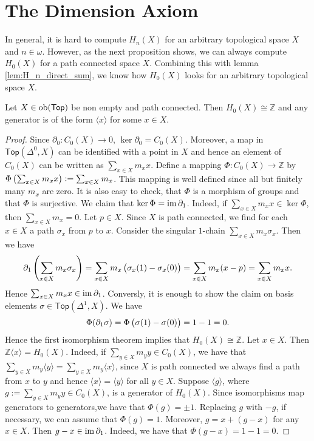 \section*{The Dimension Axiom}
In general, it is hard to compute $H_n(X)$ for an arbitrary topological space $X$ and $n \in \omega$. However, as the next proposition shows, we can always compute $H_0(X)$ for a path connected space $X$. Combining this with lemma \ref{lem:H_n_direct_sum}, we know how $H_0(X)$ looks for an arbitrary topological space $X$.

\begin{proposition}
	Let $X \in \operatorname{ob}(\mathsf{Top})$ be non empty and path connected. Then $H_0(X) \cong \mathbb{Z}$ and any generator is of the form $\langle x \rangle$ for some $x \in X$.
\end{proposition}

\begin{proof}
	Since $\partial_0 : C_0(X) \to 0$, $\ker \partial_0 = C_0(X)$. Moreover, a map in $\mathsf{Top}(\Delta^0,X)$ can be identified with a point in $X$ and hence an element of $C_0(X)$ can be written as $\sum_{x \in X}m_x x$. Define a mapping $\Phi : C_0(X) \to \mathbb{Z}$ by $\Phi\del[1]{\sum_{x \in X}m_x x} := \sum_{x \in X}m_x$. This mapping is well defined since all but finitely many $m_x$ are zero. It is also easy to check, that $\Phi$ is a morphism of groups and that $\Phi$ is surjective. We claim that $\ker \Phi = \operatorname{im} \partial_1$. Indeed, if $\sum_{x \in X} m_x x \in \ker \Phi$, then $\sum_{x \in X}m_x = 0$. Let $p \in X$. Since $X$ is path connected, we find for each $x \in X$ a path $\sigma_x$ from $p$ to $x$. Consider the singular $1$-chain $\sum_{x \in X}m_x \sigma_x$. Then we have
	\begin{equation*}
		\partial_1 \del[4]{\sum_{x \in X}m_x \sigma_x} = \sum_{x \in X}m_x \del[1]{\sigma_x(1)- \sigma_x(0)} = \sum_{x \in X}m_x (x - p) = \sum_{x \in X} m_x x.
	\end{equation*}
	Hence $\sum_{x \in X}m_x x \in \operatorname{im} \partial_1$. Conversly, it is enough to show the claim on basis elements $\sigma \in \mathsf{Top}(\Delta^1,X)$. We have
	\begin{equation*}
		\Phi(\partial_1 \sigma) = \Phi\del[1]{\sigma(1) - \sigma(0)} = 1 - 1 = 0.
	\end{equation*}
	Hence the first isomorphism theorem \cite[23]{grillet:abstract_algebra:2007} implies that $H_0(X) \cong \mathbb{Z}$.
	Let $x \in X$. Then $\mathbb{Z}\langle x \rangle = H_0(X)$. Indeed, if $\sum_{y \in X}m_y y \in C_0(X)$, we have that $\sum_{y \in X}m_y \langle y \rangle = \sum_{y \in X}m_y \langle x \rangle$, since $X$ is path connected we always find a path from $x$ to $y$ and hence $\langle x \rangle = \langle y \rangle$ for all $y \in X$. Suppose $\langle g \rangle$, where $g := \sum_{y \in X}m_y y \in C_0(X)$, is a generator of $H_0(X)$. Since isomorphisms map generators to generators,we have that $\Phi(g) = \pm 1$. Replacing $g$ with $-g$, if necessary, we can assume that $\Phi(g) = 1$. Moreover, $g = x + (g - x)$ for any $x \in X$. Then $g - x \in \operatorname{im} \partial_1$. Indeed, we have that $\Phi(g - x) = 1 - 1 = 0$.
\end{proof}

